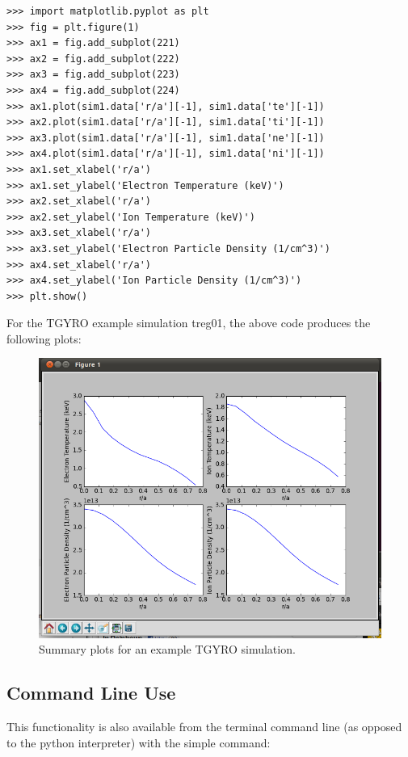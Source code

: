 \documentclass{article}
\begin{document}
\addtolength{\parskip}{-\baselineskip}

\begin{verbatim}
>>> import matplotlib.pyplot as plt
>>> fig = plt.figure(1)
>>> ax1 = fig.add_subplot(221)
>>> ax2 = fig.add_subplot(222)
>>> ax3 = fig.add_subplot(223)
>>> ax4 = fig.add_subplot(224)
>>> ax1.plot(sim1.data['r/a'][-1], sim1.data['te'][-1])
>>> ax2.plot(sim1.data['r/a'][-1], sim1.data['ti'][-1])
>>> ax3.plot(sim1.data['r/a'][-1], sim1.data['ne'][-1])
>>> ax4.plot(sim1.data['r/a'][-1], sim1.data['ni'][-1])
>>> ax1.set_xlabel('r/a')
>>> ax1.set_ylabel('Electron Temperature (keV)')
>>> ax2.set_xlabel('r/a')
>>> ax2.set_ylabel('Ion Temperature (keV)')
>>> ax3.set_xlabel('r/a')
>>> ax3.set_ylabel('Electron Particle Density (1/cm^3)')
>>> ax4.set_xlabel('r/a')
>>> ax4.set_ylabel('Ion Particle Density (1/cm^3)')
>>> plt.show()
\end{verbatim}
\addtolength{\parskip}{\baselineskip}
\fontfamily{\rmdefault}\selectfont

\noindent For the TGYRO example simulation treg01, the above code produces the following plots:

\begin{figure}[H]
  \centering
    \includegraphics[scale=.5]{pssht1.png}
  \caption{Summary plots for an example TGYRO simulation.}
\end{figure}

\subsection{Command Line Use}
\noindent This functionality is also available from the terminal command line (as opposed to the python interpreter) with the simple command:
\end{document}
